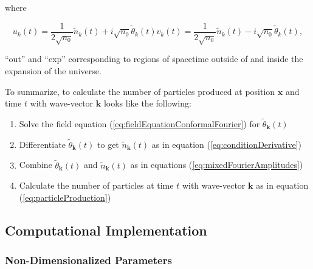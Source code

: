 \documentclass{article}
\begin{document}
            where

            \begin{subequations} \label{eq:mixedFourierAmplitudes}
            \begin{equation}
                u_k(t) = \frac{1}{2 \sqrt{n_0}} \widetilde{n}_k(t) + i \sqrt{n_0} \widetilde{\theta}_k(t)
            \end{equation}
            \begin{equation}
                v_k(t) = \frac{1}{2 \sqrt{n_0}} \widetilde{n}_k(t) - i \sqrt{n_0} \widetilde{\theta}_k(t),
            \end{equation}
            \end{subequations}

            ``out'' and ``exp'' corresponding to regions of spacetime outside of and inside the expansion of the universe.

            To summarize, to calculate the number of particles produced at position $\mathbf{x}$ and time $t$ with wave-vector $\mathbf{k}$ looks like the following:

            \begin{enumerate}
                \item Solve the field equation (\ref{eq:fieldEquationConformalFourier}) for $\widetilde{\theta}_\mathbf{k}(t)$
                \item Differentiate $\widetilde{\theta}_\mathbf{k}(t)$ to get $\widetilde{n}_\mathbf{k}(t)$ as in equation (\ref{eq:conditionDerivative})
                \item Combine $\widetilde{\theta}_\mathbf{k}(t)$ and $\widetilde{n}_\mathbf{k}(t)$ as in equations (\ref{eq:mixedFourierAmplitudes})
                \item Calculate the number of particles at time $t$ with wave-vector $\mathbf{k}$ as in equation (\ref{eq:particleProduction})
            \end{enumerate}

\pagebreak

    \subsection{Computational Implementation}

        \subsubsection{Non-Dimensionalized Parameters}
\end{document}
